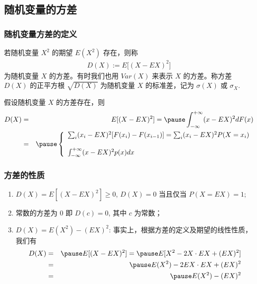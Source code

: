 	\subsection{随机变量的方差}
	\begin{frame}
		\frametitle{随机变量方差的定义}
		\begin{defi}
			若随机变量 $X^2$ 的期望 $E (X^2)$ 存在，则称
			\begin{eqnarray*}
				D(X):=E\big[(X-EX)^2\big]
			\end{eqnarray*}
			为随机变量 $X$ 的方差。有时我们也用 $Var (X)$ 来表示 $X$ 的方差。称方差 $D (X)$ 的正平方根 $\sqrt{D (X)}$ 为随机变量 $X$ 的标准差，记为 $\sigma (X)$ 或 $\sigma_X$.
		\end{defi}
		\pause
		\begin{thm}
			假设随机变量 $X$ 的方差存在，则
			\begin{eqnarray*}
				D(X)&=&E[(X-EX)^2]=\pause \int_{-\infty}^{+\infty}(x-EX)^2dF(x)\\
				&=&\pause \left\{
				\begin{array}{l}
					\sum_{i}(x_i-EX)^2[F(x_i)-F(x_{i-1})]=\sum_{i}(x_i-EX)^2P(X=x_i)\\
					\\
					\int_{-\infty}^{+\infty}(x-EX)^2p(x)dx  \end{array}
				\right.
			\end{eqnarray*}

		\end{thm}

	\end{frame}
	\begin{frame}
		\frametitle{方差的性质}
		\begin{enumerate}[<+-|alert@+>]
			\item $D (X)=E[(X-EX)^2]\ge 0$, $D (X)=0$ 当且仅当 $P (X=EX)=1$;
			\item 常数的方差为 $0$ 即 $D (c)=0$, 其中 $c$ 为常数；
			\item $D (X)=E (X^2)-(EX)^2$: 事实上，根据方差的定义及期望的线性性质，我们有 \pause
			\begin{eqnarray*}
				D(X)&=&\pause E[(X-EX)^2]=\pause E[X^2-2X\cdot EX+(EX)^2]\\
				&=&\pause E(X^2)-2EX\cdot EX+(EX)^2\\
				&=&\pause E(X^2)-(EX)^2
			\end{eqnarray*}
		\end{enumerate}

	\end{frame}
